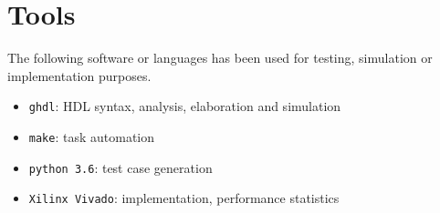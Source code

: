 \section{Tools}
The following software or languages has been used for testing, simulation or
implementation purposes.

\begin{itemize}
  \item \texttt{ghdl}: HDL syntax, analysis, elaboration and simulation
  \item \texttt{make}: task automation
  \item \texttt{python 3.6}: test case generation
  \item \texttt{Xilinx Vivado}: implementation, performance statistics
\end{itemize}

